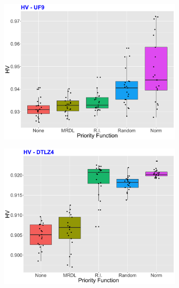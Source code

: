 \begin{figure}[!t]
	\begin{subfigure}[b]{0.33\textwidth}
		\centering
	\includegraphics[width=1\textwidth, height=1\textwidth]{images/UF9_HV.png}
	\end{subfigure}
	\begin{subfigure}[b]{0.33\textwidth}
		\centering
	\includegraphics[width=1\textwidth, height=1\textwidth]{images/DTLZ4_HV.png}

\end{subfigure}
\end{figure}
